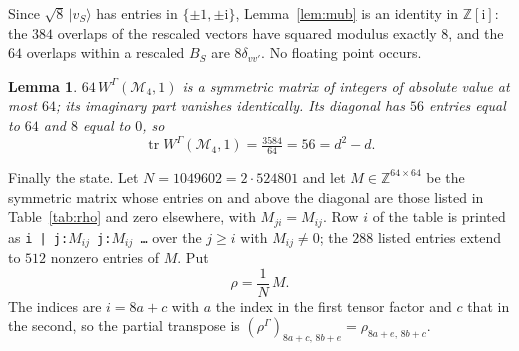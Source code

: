 \documentclass[11pt]{amsart}
\newtheorem{lemma}[theorem]{Lemma}
\DeclareMathOperator{\Tr}{tr}
\newcommand{\W}{W^{\Gamma}}
\newcommand{\M}{\mathcal M}
\newcommand{\ii}{\mathrm i}
\begin{document}
Since $\sqrt8\,|v_S\rangle$ has entries in $\{\pm1,\pm\ii\}$, Lemma~\ref{lem:mub} is
an identity in $\mathbb Z[\ii]$: the $384$ overlaps of the rescaled vectors have
squared modulus exactly $8$, and the $64$ overlaps within a rescaled $B_S$ are
$8\delta_{vv'}$. No floating point occurs.

\begin{lemma}\label{lem:W}
$64\,\W(\M_4,1)$ is a symmetric matrix of integers of absolute value at most $64$; its
imaginary part vanishes identically. Its diagonal has $56$ entries equal to $64$ and
$8$ equal to $0$, so
\[
  \Tr \W(\M_4,1)=\tfrac{3584}{64}=56=d^2-d .
\]
\end{lemma}

Finally the state. Let $N=1049602=2\cdot524801$ and let $M\in\mathbb Z^{64\times64}$
be the symmetric matrix whose entries on and above the diagonal are those listed in
Table~\ref{tab:rho} and zero elsewhere, with $M_{ji}=M_{ij}$. Row $i$ of the table is
printed as \texttt{i | j:$M_{ij}$ j:$M_{ij}$ \dots} over the $j\ge i$ with
$M_{ij}\ne0$; the $288$ listed entries extend to $512$ nonzero entries of $M$. Put
\begin{equation}\label{eq:rho}
  \rho=\frac1N\,M .
\end{equation}
The indices are $i=8a+c$ with $a$ the index in the first tensor factor and $c$ that in
the second, so the partial transpose is
$(\rho^{\Gamma})_{8a+c,\,8b+e}=\rho_{8a+e,\,8b+c}$.
\end{document}
